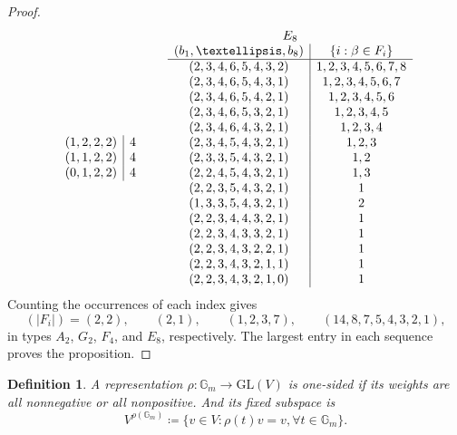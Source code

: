 \documentclass[10pt,a4paper]{amsart}
\newtheorem{definition}[theorem]{Definition}
\newcommand{\Gm}{\mathbb G_m}
\newcommand{\GL}{\mathrm{GL}}
\begin{document}
\begin{proof}
{\[\begin{array}{c|c}
    (1,2,2,2)&4\\
    (1,1,2,2)&4\\
    (0,1,2,2)&4
    \end{array}
    \qquad
    \begin{array}{c|c}
    \multicolumn{2}{c}{E_8}\\
    (b_1,\ldots,b_8)&\{i:\beta\in F_i\}\\ \hline
    (2,3,4,6,5,4,3,2)&1,2,3,4,5,6,7,8\\
    (2,3,4,6,5,4,3,1)&1,2,3,4,5,6,7\\
    (2,3,4,6,5,4,2,1)&1,2,3,4,5,6\\
    (2,3,4,6,5,3,2,1)&1,2,3,4,5\\
    (2,3,4,6,4,3,2,1)&1,2,3,4\\
    (2,3,4,5,4,3,2,1)&1,2,3\\
    (2,3,3,5,4,3,2,1)&1,2\\
    (2,2,4,5,4,3,2,1)&1,3\\
    (2,2,3,5,4,3,2,1)&1\\
    (1,3,3,5,4,3,2,1)&2\\
    (2,2,3,4,4,3,2,1)&1\\
    (2,2,3,4,3,3,2,1)&1\\
    (2,2,3,4,3,2,2,1)&1\\
    (2,2,3,4,3,2,1,1)&1\\
    (2,2,3,4,3,2,1,0)&1
    \end{array}
    \]
    }
    Counting the occurrences of each index gives
    \[
        (|F_i|)=(2,2),\qquad(2,1),\qquad(1,2,3,7),\qquad
        (14,8,7,5,4,3,2,1),
    \]
    in types $A_2$, $G_2$, $F_4$, and $E_8$, respectively. The largest entry in each sequence proves the proposition.
\end{proof}

\begin{definition}
    A representation $\rho:\Gm\to\GL(V)$ is \emph{one-sided} if its weights are all nonnegative or all nonpositive. And its fixed subspace is $$V^{\rho(\Gm)}\coloneqq\{v\in V:\rho(t)v=v,\forall t\in\Gm\}.$$
\end{definition}
\end{document}
